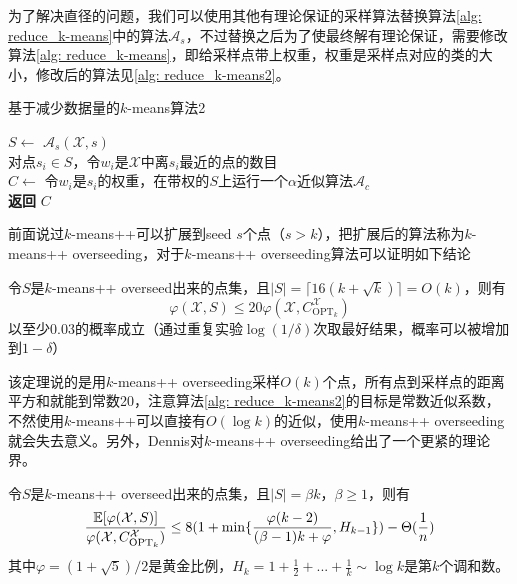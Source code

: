 为了解决直径的问题，我们可以使用其他有理论保证的采样算法替换算法\ref{alg: reduce_k-means}中的算法$\mathcal{A}_s$，不过替换之后为了使最终解有理论保证，需要修改算法\ref{alg: reduce_k-means}，即给采样点带上权重，权重是采样点对应的类的大小，修改后的算法见\ref{alg: reduce_k-means2}。
\begin{algorithm}
    \caption{基于减少数据量的$k$-means算法2}\label{alg: reduce_k-means2}
    $S \gets$ $\mathcal{A}_s(\mathcal{X},s)$ \\
    对点$s_i \in S$，令$w_i$是$\mathcal{X}$中离$s_i$最近的点的数目 \\
    $C \gets$ 令$w_i$是$s_i$的权重，在带权的$S$上运行一个$\alpha$近似算法$\mathcal{A}_c$ \\
    \textbf{返回} $C$
\end{algorithm}
前面说过$k$-means++可以扩展到seed $s$个点（$s>k$），把扩展后的算法称为$k$-means++ overseeding，对于$k$-means++ overseeding算法可以证明如下结论
\begin{theorem}
    \label{theo: k-means++ overseeding1}
    令$S$是$k$-means++ overseed出来的点集，且$|S| = \lceil 16(k+\sqrt{k}) \rceil = O(k)$，则有
    \begin{equation*}
        \varphi(\mathcal{X},S) \leq 20 \varphi(\mathcal{X},C_{\text{OPT}_k}^{\mathcal{X}})
    \end{equation*}
    以至少0.03的概率成立（通过重复实验$\log (1/\delta)$次取最好结果，概率可以被增加到$1-\delta$）
\end{theorem}
该定理说的是用$k$-means++ overseeding采样$O(k)$个点，所有点到采样点的距离平方和就能到常数20，注意算法\ref{alg: reduce_k-means2}的目标是常数近似系数，不然使用$k$-means++可以直接有$O(\log k)$的近似，使用$k$-means++ overseeding就会失去意义。另外，Dennis对$k$-means++ overseeding给出了一个更紧的理论界。
\begin{theorem}
    \label{theo: k-means++ overseeding2}
    令$S$是$k$-means++ overseed出来的点集，且$|S| = \beta k$，$\beta \geq 1$，则有
    \begin{equation*}
        \frac{\mathbb{E}[\varphi(\mathcal{X},S)]}{\varphi(\mathcal{X},C_{\text{OPT}_k}^{\mathcal{X}})} \leq 8(1+\min\{\frac{\varphi(k-2)}{(\beta -1)k + \varphi},H_{k-1}\}) - \Theta(\frac{1}{n})
    \end{equation*}
    其中$\varphi = (1+\sqrt{5})/2$是黄金比例，$H_k = 1+\frac{1}{2}+...+\frac{1}{k} \sim \log k$是第$k$个调和数。
\end{theorem}
